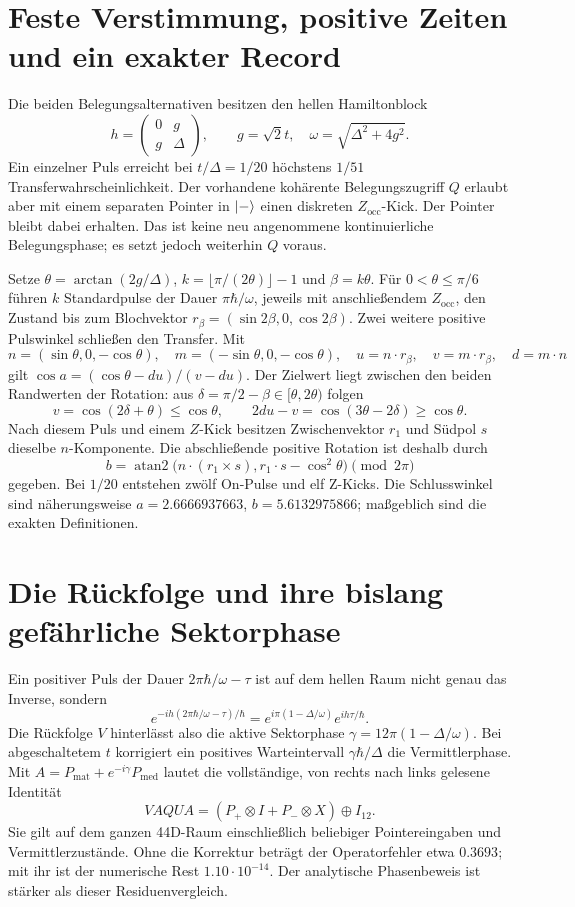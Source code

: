\section{Feste Verstimmung, positive Zeiten und ein exakter Record}
Die beiden Belegungsalternativen besitzen den hellen Hamiltonblock
\[
h=\begin{pmatrix}0&g\\g&\Delta\end{pmatrix},\qquad
g=\sqrt2t,\quad\omega=\sqrt{\Delta^2+4g^2}.
\]
Ein einzelner Puls erreicht bei $t/\Delta=1/20$ höchstens $1/51$ Transferwahrscheinlichkeit. Der vorhandene kohärente Belegungszugriff $Q$ erlaubt aber mit einem separaten Pointer in $\lvert-\rangle$ einen diskreten $Z_\mathrm{occ}$-Kick. Der Pointer bleibt dabei erhalten. Das ist keine neu angenommene kontinuierliche Belegungsphase; es setzt jedoch weiterhin $Q$ voraus.

Setze $\theta=\arctan(2g/\Delta)$, $k=\lfloor\pi/(2\theta)\rfloor-1$ und $\beta=k\theta$. Für $0<\theta\le\pi/6$ führen $k$ Standardpulse der Dauer $\pi\hbar/\omega$, jeweils mit anschließendem $Z_\mathrm{occ}$, den Zustand bis zum Blochvektor $r_\beta=(\sin2\beta,0,\cos2\beta)$. Zwei weitere positive Pulswinkel schließen den Transfer. Mit
\[
n=(\sin\theta,0,-\cos\theta),\quad m=(-\sin\theta,0,-\cos\theta),
\quad u=n\cdot r_\beta,\quad v=m\cdot r_\beta,\quad d=m\cdot n
\]
gilt $\cos a=(\cos\theta-du)/(v-du)$. Der Zielwert liegt zwischen den beiden Randwerten der Rotation: aus $\delta=\pi/2-\beta\in[\theta,2\theta)$ folgen
\[
v=\cos(2\delta+\theta)\le\cos\theta,
\qquad 2du-v=\cos(3\theta-2\delta)\ge\cos\theta.
\]
Nach diesem Puls und einem $Z$-Kick besitzen Zwischenvektor $r_1$ und Südpol $s$ dieselbe $n$-Komponente. Die abschließende positive Rotation ist deshalb durch
\[
b=\operatorname{atan2}\bigl(n\cdot(r_1\times s),r_1\cdot s-\cos^2\theta\bigr)
\pmod{2\pi}
\]
gegeben. Bei $1/20$ entstehen zwölf On-Pulse und elf Z-Kicks. Die Schlusswinkel sind näherungsweise $a=2.6666937663$, $b=5.6132975866$; maßgeblich sind die exakten Definitionen.

\section{Die Rückfolge und ihre bislang gefährliche Sektorphase}
Ein positiver Puls der Dauer $2\pi\hbar/\omega-\tau$ ist auf dem hellen Raum nicht genau das Inverse, sondern
\[
e^{-ih(2\pi\hbar/\omega-\tau)/\hbar}
=e^{i\pi(1-\Delta/\omega)}e^{ih\tau/\hbar}.
\]
Die Rückfolge $V$ hinterlässt also die aktive Sektorphase
$\gamma=12\pi(1-\Delta/\omega)$. Bei abgeschaltetem $t$ korrigiert ein positives Warteintervall $\gamma\hbar/\Delta$ die Vermittlerphase. Mit $A=P_\mathrm{mat}+e^{-i\gamma}P_\mathrm{med}$ lautet die vollständige, von rechts nach links gelesene Identität
\[
\boxed{VAQUA=(P_+\otimes I+P_-\otimes X)\oplus I_{12}.}
\]
Sie gilt auf dem ganzen 44D-Raum einschließlich beliebiger Pointereingaben und Vermittlerzustände. Ohne die Korrektur beträgt der Operatorfehler etwa $0.3693$; mit ihr ist der numerische Rest $1.10\cdot10^{-14}$. Der analytische Phasenbeweis ist stärker als dieser Residuenvergleich.

